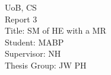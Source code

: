 \begin{titlepage}
\begin{center}

	{UoB, CS}\\
	{Report 3}\\
	{Title: SM of HE with a MR}\\
	{Student: MABP}\\
	{Supervisor: NH}\\
	{Thesis Group: JW PH}

\end{center}
\end{titlepage}
